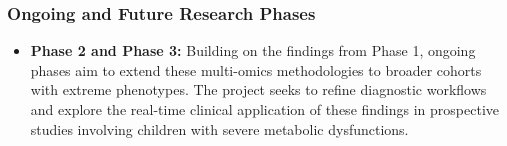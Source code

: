 \subsubsection*{Ongoing and Future Research Phases}
\begin{itemize}
    \item \textbf{Phase 2 and Phase 3:} Building on the findings from Phase 1, ongoing phases aim to extend these multi-omics methodologies to broader cohorts with extreme phenotypes. The project seeks to refine diagnostic workflows and explore the real-time clinical application of these findings in prospective studies involving children with severe metabolic dysfunctions.
\end{itemize}


